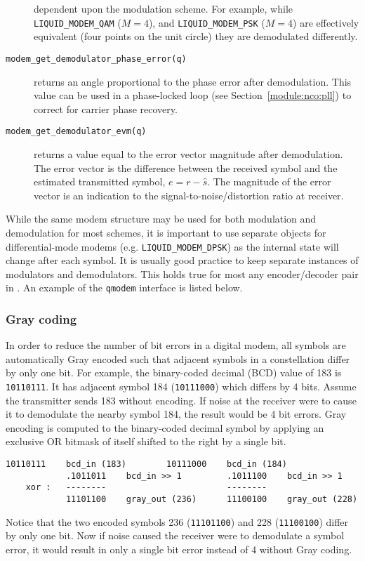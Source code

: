 \begin{description}
    dependent upon the modulation scheme.
    For example, while
    {\tt LIQUID\_MODEM\_QAM} ($M=4$), and
    {\tt LIQUID\_MODEM\_PSK} ($M=4$)
    are effectively equivalent (four points on the unit circle)
    they are demodulated differently.
\item[{\tt modem\_get\_demodulator\_phase\_error(q)}]
    returns an angle proportional to the phase error after demodulation.
    This value can be used in a phase-locked loop
    (see Section~\ref{module:nco:pll})
    to correct for carrier phase recovery.
\item[{\tt modem\_get\_demodulator\_evm(q)}]
    returns a value equal to the error vector magnitude after demodulation.
    The error vector is the difference between the received symbol and the
    estimated transmitted symbol, $e = r - \hat{s}$.
    The magnitude of the error vector is an indication to the
    signal-to-noise/distortion ratio at receiver.
\end{description}

While the same modem structure may be used for both modulation and
demodulation for most schemes, it is important to use separate objects
for differential-mode modems (e.g. {\tt LIQUID\_MODEM\_DPSK}) as the internal state
will change after each symbol.
It is usually good practice to keep separate instances of modulators and
demodulators.
This holds true for most any encoder/decoder pair in \liquid.
%
An example of the {\tt qmodem} interface is listed below.
%

%

\subsubsection{Gray coding}
\label{module:modem:digital:gray_coding}
In order to reduce the number of bit errors in a digital modem,
all symbols are automatically Gray encoded such that
adjacent symbols in a constellation differ by only one bit.
%
For example, the binary-coded decimal (BCD) value of 183 is {\tt 10110111}.
It has adjacent symbol 184 ({\tt 10111000}) which differs by 4 bits.
Assume the transmitter sends 183 without encoding.
If noise at the receiver were to cause it to demodulate the nearby
symbol 184, the result would be 4 bit errors.
%
Gray encoding is computed to the binary-coded decimal symbol
by applying an exclusive OR bitmask of itself shifted to the right by a
single bit.
%
\begin{Verbatim}[fontsize=\small]
            10110111    bcd_in (183)        10111000    bcd_in (184)
            .1011011    bcd_in >> 1         .1011100    bcd_in >> 1
    xor :   --------                        --------
            11101100    gray_out (236)      11100100    gray_out (228)
\end{Verbatim}
%
Notice that the two encoded symbols
236 ({\tt 11101100}) and
228 ({\tt 11100100}) differ by only one bit.
Now if noise caused the receiver were to demodulate a symbol error, it would
result in only a single bit error instead of 4 without Gray coding.

